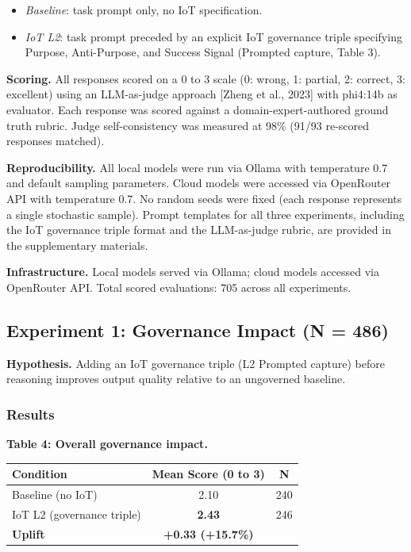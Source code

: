 \documentclass[11pt,a4paper]{article}
\providecommand{\tightlist}{%
  \setlength{\itemsep}{0pt}\setlength{\parskip}{0pt}}
\begin{document}
\begin{itemize}
\tightlist
\item
  \emph{Baseline}: task prompt only, no IoT specification.
\item
  \emph{IoT L2}: task prompt preceded by an explicit IoT governance
  triple specifying Purpose, Anti-Purpose, and Success Signal (Prompted
  capture, Table 3).
\end{itemize}

\textbf{Scoring.} All responses scored on a 0 to 3 scale (0: wrong, 1:
partial, 2: correct, 3: excellent) using an LLM-as-judge approach
{[}Zheng et al., 2023{]} with phi4:14b as evaluator. Each response was
scored against a domain-expert-authored ground truth rubric. Judge
self-consistency was measured at 98\% (91/93 re-scored responses
matched).

\textbf{Reproducibility.} All local models were run via Ollama with
temperature 0.7 and default sampling parameters. Cloud models were
accessed via OpenRouter API with temperature 0.7. No random seeds were
fixed (each response represents a single stochastic sample). Prompt
templates for all three experiments, including the IoT governance triple
format and the LLM-as-judge rubric, are provided in the supplementary
materials.

\textbf{Infrastructure.} Local models served via Ollama; cloud models
accessed via OpenRouter API. Total scored evaluations: 705 across all
experiments.

\subsection{Experiment 1: Governance Impact (N =
486)}\label{experiment-1-governance-impact-n-486}

\textbf{Hypothesis.} Adding an IoT governance triple (L2 Prompted
capture) before reasoning improves output quality relative to an
ungoverned baseline.

\subsubsection{Results}\label{results}

\textbf{Table 4: Overall governance impact.}

{\small\begin{longtable}[]{@{}lcc@{}}
\toprule\noalign{}
Condition & Mean Score (0 to 3) & N \\
\midrule\noalign{}
\endhead
\bottomrule\noalign{}
\endlastfoot
Baseline (no IoT) & 2.10 & 240 \\
IoT L2 (governance triple) & \textbf{2.43} & 246 \\
\textbf{Uplift} & \textbf{+0.33 (+15.7\%)} & \\
\end{longtable}}
\end{document}
